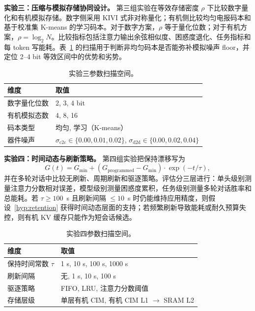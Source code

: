 \noindent\textbf{实验三：压缩与模拟存储协同设计。}\label{sec:exp3_compression}
第三组实验在等效存储密度 $\rho$ 下比较数字量化和有机模拟存储。数字侧采用 KIVI 式非对称量化；有机侧比较均匀电报码本和基于校准集 K-means 的学习码本。对于数字方案，$\rho$ 等于量化位数；对于有机方案，$\rho=\log_2N$。比较指标包括注意力输出余弦相似度、困惑度退化、任务指标和每 token 写能耗。表~\ref{tab:exp3_grid} 的扫描用于判断非均匀码本是否能弥补模拟噪声 floor，并定位 2--4 bit 等效区间中的优势和劣势。

\begin{table}[!htbp]
\centering
\caption{实验三参数扫描空间。}
\label{tab:exp3_grid}
\begin{tabular}{@{}ll@{}}
\toprule
维度 & 取值 \\
\midrule
数字量化位数 & 2, 3, 4 bit \\
有机模拟态数 & 4, 8, 16 \\
码本类型 & 均匀, 学习（K-means） \\
器件噪声 & $\sigma_{\text{c2c}}\in\{0.00,0.01,0.02\}$, $\sigma_{\text{d2d}}\in\{0.00,0.02,0.04\}$ \\
\bottomrule
\end{tabular}
\end{table}

\noindent\textbf{实验四：时间动态与刷新策略。}\label{sec:exp4_temporal}
第四组实验把保持漂移写为
\begin{equation}
G(t) = G_{\min} + (G_{\text{programmed}} - G_{\min}) \cdot \exp(-t / \tau),
\label{eq:retention_decay}
\end{equation}
并在多轮对话中比较无刷新、周期刷新和驱逐策略。评估分三层进行：单头级别测量注意力分数相对误差，模型级别测量困惑度累积，任务级别测量多轮对话胜率和总能耗。若 $\tau\ge100$~s 且刷新间隔 $\le10$~s 时仍能维持应用精度，则假设~\ref{hyp:retention} 获得时间动态层面的支持；若频繁刷新导致能耗或耐久预算失控，则有机 KV 缓存只能作为短会话候选。

\begin{table}[!htbp]
\centering
\caption{实验四参数扫描空间。}
\label{tab:exp4_grid}
\begin{tabular}{@{}ll@{}}
\toprule
维度 & 取值 \\
\midrule
保持时间常数 $\tau$ & 1 s, 10 s, 100 s, 1000 s \\
刷新间隔 & 无, 1 s, 10 s, 100 s \\
驱逐策略 & FIFO, LRU, 注意力分数阈值 \\
存储层级 & 单层有机 CIM, 有机 CIM L1 $\rightarrow$ SRAM L2 \\
\bottomrule
\end{tabular}
\end{table}

